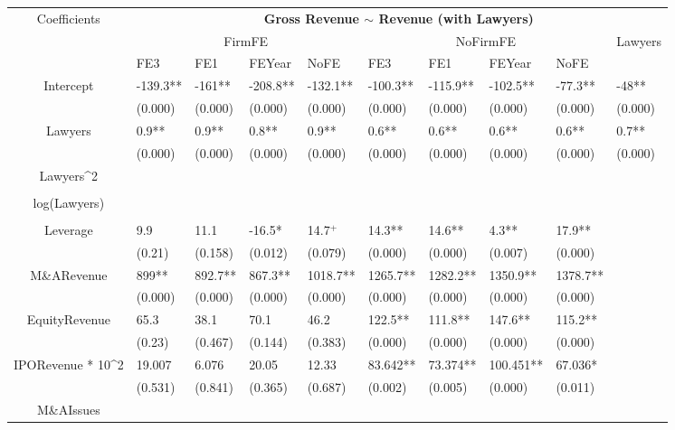 \documentclass{article}
\begin{document}
\begin{table}[H]
\centering
\begin{tabular}{|clllllllll|}
\hline
\multirow{3}{*}{Coefficients} & \multicolumn{9}{c|}{\textbf{Gross Revenue $\sim$ Revenue (with Lawyers)}} \\
\cline{2-10}
& \multicolumn{4}{c}{FirmFE} & \multicolumn{4}{c}{NoFirmFE} & \multirow{2}{*}{Lawyers} \\
\cline{2-9}
& FE3 & FE1 & FEYear & NoFE & FE3 & FE1 & FEYear & NoFE &  \\
\hline
 
Intercept & -139.3** & -161** & -208.8** & -132.1** & -100.3** & -115.9** & -102.5** & -77.3** & -48** \\ 
   & (0.000) & (0.000) & (0.000) & (0.000) & (0.000) & (0.000) & (0.000) & (0.000) & (0.000) \\ 
  Lawyers & 0.9** & 0.9** & 0.8** & 0.9** & 0.6** & 0.6** & 0.6** & 0.6** & 0.7** \\ 
   & (0.000) & (0.000) & (0.000) & (0.000) & (0.000) & (0.000) & (0.000) & (0.000) & (0.000) \\ 
  Lawyers^2 &  &  &  &  &  &  &  &  &  \\ 
   &  &  &  &  &  &  &  &  &  \\ 
  log(Lawyers) &  &  &  &  &  &  &  &  &  \\ 
   &  &  &  &  &  &  &  &  &  \\ 
  Leverage & 9.9 & 11.1 & -16.5* & 14.7$^{+}$ & 14.3** & 14.6** & 4.3** & 17.9** &  \\ 
   & (0.21) & (0.158) & (0.012) & (0.079) & (0.000) & (0.000) & (0.007) & (0.000) &  \\ 
  M\&ARevenue & 899** & 892.7** & 867.3** & 1018.7** & 1265.7** & 1282.2** & 1350.9** & 1378.7** &  \\ 
   & (0.000) & (0.000) & (0.000) & (0.000) & (0.000) & (0.000) & (0.000) & (0.000) &  \\ 
  EquityRevenue & 65.3 & 38.1 & 70.1 & 46.2 & 122.5** & 111.8** & 147.6** & 115.2** &  \\ 
   & (0.23) & (0.467) & (0.144) & (0.383) & (0.000) & (0.000) & (0.000) & (0.000) &  \\ 
  IPORevenue * 10^2 & 19.007 & 6.076 & 20.05 & 12.33 & 83.642** & 73.374** & 100.451** & 67.036* &  \\ 
   & (0.531) & (0.841) & (0.365) & (0.687) & (0.002) & (0.005) & (0.000) & (0.011) &  \\ 
  M\&AIssues &  &  &  &  &  &  &  &  &  \\ 

\end{tabular}
\end{table}
\end{document}
